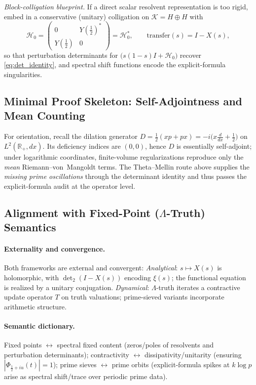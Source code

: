 \emph{Block-colligation blueprint.}
If a direct scalar resolvent representation is too rigid, embed in a conservative (unitary) colligation on \(\mathcal{K}=H\oplus H\) with
\[
\mathcal{H}_0=\begin{pmatrix}0 & Y(\tfrac12)^{*}\\[2pt] Y(\tfrac12) & 0\end{pmatrix}=\mathcal{H}_0^{*},
\qquad
\text{transfer}(s)=I-X(s),
\]
so that perturbation determinants for \(\big(s(1-s)I+\mathcal{H}_0\big)\) recover \eqref{eq:det_identity}, and spectral shift functions encode the explicit-formula singularities.

\subsection{Minimal Proof Skeleton: Self-Adjointness and Mean Counting}

For orientation, recall the dilation generator \(D=\tfrac12(xp+px)=-i\big(x\tfrac{d}{dx}+\tfrac12\big)\) on \(L^2(\mathbb{R}_+,dx)\).
Its deficiency indices are \((0,0)\), hence \(D\) is essentially self-adjoint; under logarithmic coordinates, finite-volume regularizations reproduce only the \emph{mean} Riemann–von~Mangoldt terms.
The Theta–Mellin route above supplies the \emph{missing prime oscillations} through the determinant identity and thus passes the explicit-formula audit at the operator level.

\subsection{Alignment with Fixed-Point (\texorpdfstring{$\Lambda$}{Λ}-Truth) Semantics}

\paragraph{Externality and convergence.}
Both frameworks are external and convergent:
\emph{Analytical}: \(s\mapsto X(s)\) is holomorphic, with \(\det_2(I-X(s))\) encoding \(\xi(s)\); the functional equation is realized by a unitary conjugation.
\emph{Dynamical}: \(\Lambda\)-truth iterates a contractive update operator \(T\) on truth valuations; prime-sieved variants incorporate arithmetic structure.

\paragraph{Semantic dictionary.}
Fixed points \(\leftrightarrow\) spectral fixed content (zeros/poles of resolvents and perturbation determinants);
contractivity \(\leftrightarrow\) dissipativity/unitarity (ensuring \(|\Phi_{\frac12+iu}(t)|=1\));
prime sieves \(\leftrightarrow\) prime orbits (explicit-formula spikes at \(k\log p\) arise as spectral shift/trace over periodic prime data).

